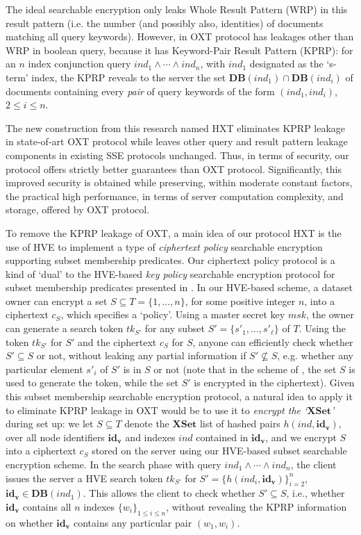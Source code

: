The ideal searchable encryption only leaks Whole Result Pattern (WRP) in this result pattern (i.e. the number (and possibly also, identities) of documents matching all query keywords). However, in OXT protocol has leakages other than WRP in boolean query, because it has Keyword-Pair Result Pattern (KPRP): for an $n$ index conjunction query $ind_1 \wedge \cdots \wedge ind_n$, with $ind_1$ designated as the `s-term' index, the KPRP reveals to the server the set $\mathbf{DB}(ind_1) \cap \mathbf{DB}(ind_i)$ of documents containing every \emph{pair} of query keywords of the form $(ind_1, ind_i)$, $2\leq i\leq n$.

The new construction from this research named HXT eliminates KPRP leakage in state-of-art OXT protocol while leaves other query and result pattern leakage components in existing SSE protocols unchanged. Thus, in terms of security, our protocol offers strictly better guarantees than OXT protocol. Significantly, this improved security is obtained while preserving, within moderate constant factors, the practical high performance, in terms of server computation complexity, and storage, offered by OXT protocol.

To remove the KPRP leakage of OXT, a main idea of our protocol HXT is the use of HVE to implement a type of \emph{ciphertext policy} searchable encryption supporting subset membership predicates. Our ciphertext policy protocol is a kind of `dual' to the HVE-based \emph{key policy} searchable encryption protocol for subset membership predicates presented in \cite{boneh2007conjunctive}. In our HVE-based scheme, a dataset owner can encrypt a set $S \subseteq T=\{1,\ldots,n\}$, for some positive integer $n$, into a ciphertext $c_S$, which specifies a `policy'. Using a master secret key $msk$, the owner can generate a search token $tk_{S'}$ for any subset $S' = \{s'_1,\ldots,s'_\ell\}$ of $T$. Using the token $tk_{S'}$ for $S'$ and the ciphertext $c_S$ for $S$, anyone can efficiently check whether $S' \subseteq S$ or not, without leaking any partial information if $S' \not\subseteq S$, e.g. whether any particular element $s'_i$ of $S'$ is in $S$ or not (note that in the scheme of \cite{boneh2007conjunctive}, the set $S$ is used to generate the token, while the set $S'$ is encrypted in the ciphertext). 
Given this subset membership searchable encryption protocol, a natural idea to apply it to eliminate KPRP leakage in OXT would be to use it to \emph{encrypt the `$\mathbf{XSet}$'} during set up: we let $S \subseteq T$ denote the $\mathbf{XSet}$ list of hashed pairs $h(ind, \mathbf{id_v})$, over all node identifiers $\mathbf{id_v}$ and indexes $ind$ contained in $\mathbf{id_v}$, and we encrypt $S$ into a ciphertext $c_S$ stored on the server using our HVE-based subset searchable encryption scheme. In the search phase with query $ind_1 \wedge \cdots \wedge ind_n$, the client issues the server a HVE search token $tk_{S'}$ for $S' = \{h(ind_i, \mathbf{id_v})\}_{i=2}^n$, $\mathbf{id_v} \in \mathbf{DB}(ind_1)$. This allows the client to check whether $S'\subseteq S$, i.e., whether $\mathbf{id_v}$ contains all $n$ indexes $\{w_i\}_{1\leq i\leq n}$, without revealing the KPRP information on whether $\mathbf{id_v}$ contains any particular pair $(w_1,w_i)$.

